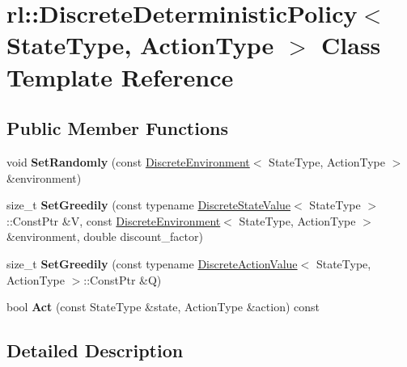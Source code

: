 \hypertarget{classrl_1_1_discrete_deterministic_policy}{}\section{rl\+:\+:Discrete\+Deterministic\+Policy$<$ State\+Type, Action\+Type $>$ Class Template Reference}
\label{classrl_1_1_discrete_deterministic_policy}
\subsection*{Public Member Functions}
\begin{DoxyCompactItemize}
\item 
\hypertarget{classrl_1_1_discrete_deterministic_policy_aa0502bdff3bbe4896d52b50e6fb682f3}{}\label{classrl_1_1_discrete_deterministic_policy_aa0502bdff3bbe4896d52b50e6fb682f3} 
void {\bfseries Set\+Randomly} (const \hyperlink{classrl_1_1_discrete_environment}{Discrete\+Environment}$<$ State\+Type, Action\+Type $>$ \&environment)
\item 
\hypertarget{classrl_1_1_discrete_deterministic_policy_ae1f5768f1189f650a37a280441a5a5f6}{}\label{classrl_1_1_discrete_deterministic_policy_ae1f5768f1189f650a37a280441a5a5f6} 
size\+\_\+t {\bfseries Set\+Greedily} (const typename \hyperlink{structrl_1_1_discrete_state_value}{Discrete\+State\+Value}$<$ State\+Type $>$\+::Const\+Ptr \&V, const \hyperlink{classrl_1_1_discrete_environment}{Discrete\+Environment}$<$ State\+Type, Action\+Type $>$ \&environment, double discount\+\_\+factor)
\item 
\hypertarget{classrl_1_1_discrete_deterministic_policy_a5361f9e8902b11c044953a44c39e0dbb}{}\label{classrl_1_1_discrete_deterministic_policy_a5361f9e8902b11c044953a44c39e0dbb} 
size\+\_\+t {\bfseries Set\+Greedily} (const typename \hyperlink{structrl_1_1_discrete_action_value}{Discrete\+Action\+Value}$<$ State\+Type, Action\+Type $>$\+::Const\+Ptr \&Q)
\item 
\hypertarget{classrl_1_1_discrete_deterministic_policy_aa464571566c0a6f97bb7e415fb78a491}{}\label{classrl_1_1_discrete_deterministic_policy_aa464571566c0a6f97bb7e415fb78a491} 
bool {\bfseries Act} (const State\+Type \&state, Action\+Type \&action) const
\end{DoxyCompactItemize}


\subsection{Detailed Description}
